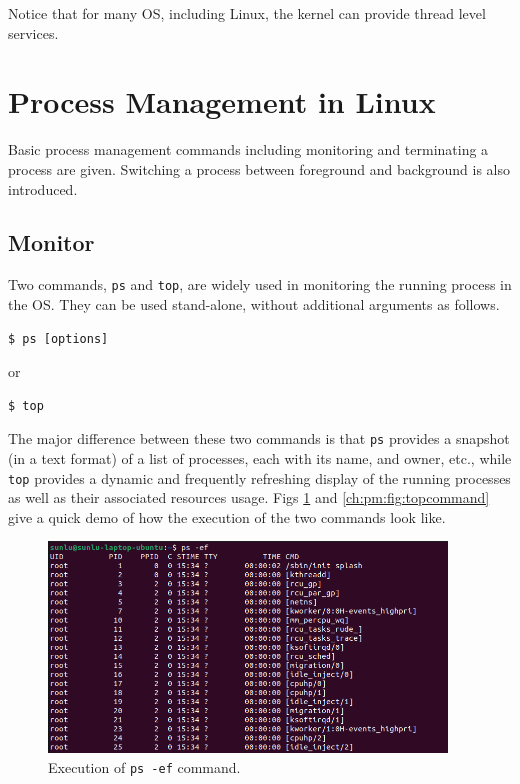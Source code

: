 Notice that for many OS, including Linux, the kernel can provide thread level services.

\section{Process Management in Linux}

Basic process management commands including monitoring and terminating a process are given. Switching a process between foreground and background is also introduced.

\subsection{Monitor}

Two commands, \verb|ps| and \verb|top|, are widely used in monitoring the running process in the OS. They can be used stand-alone, without additional arguments as follows.
\begin{lstlisting}
$ ps [options]
\end{lstlisting}
or
\begin{lstlisting}
$ top
\end{lstlisting}

The major difference between these two commands is that \verb|ps| provides a snapshot (in a text format) of a list of processes, each with its name,  and owner, etc., while \verb|top| provides a dynamic and frequently refreshing display of the running processes as well as their associated resources usage. Figs \ref{ch:pm:fig:pscommand} and \ref{ch:pm:fig:topcommand} give a quick demo of how the execution of the two commands look like.

\begin{figure}[!htb]
	\centering
	\includegraphics[width=300pt]{chapters/part-1/figures/pscommand.png}
	\caption{Execution of \texttt{ps -ef} command.} \label{ch:pm:fig:pscommand}
\end{figure}

